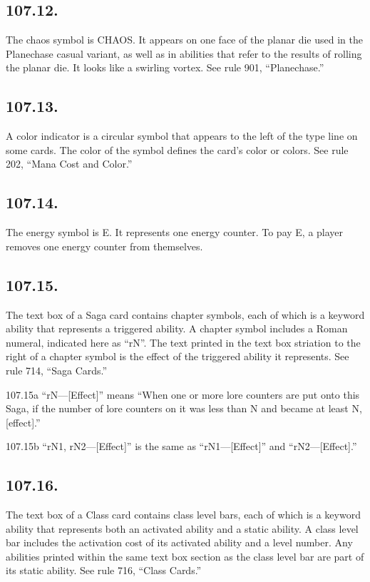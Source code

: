 \subsection*{107.12.}
The chaos symbol is {CHAOS}. It appears on one face of the planar die used in the Planechase casual variant, as well as in abilities that refer to the results of rolling the planar die. It looks like a swirling vortex. See rule 901, “Planechase.”

\subsection*{107.13.}
A color indicator is a circular symbol that appears to the left of the type line on some cards. The color of the symbol defines the card’s color or colors. See rule 202, “Mana Cost and Color.”

\subsection*{107.14.}
The energy symbol is {E}. It represents one energy counter. To pay {E}, a player removes one energy counter from themselves.

\subsection*{107.15.}
The text box of a Saga card contains chapter symbols, each of which is a keyword ability that represents a triggered ability. A chapter symbol includes a Roman numeral, indicated here as “rN”. The text printed in the text box striation to the right of a chapter symbol is the effect of the triggered ability it represents. See rule 714, “Saga Cards.”

107.15a “{rN}—[Effect]” means “When one or more lore counters are put onto this Saga, if the number of lore counters on it was less than N and became at least N, [effect].”

107.15b “{rN1}, {rN2}—[Effect]” is the same as “{rN1}—[Effect]” and “{rN2}—[Effect].”

\subsection*{107.16.}
The text box of a Class card contains class level bars, each of which is a keyword ability that represents both an activated ability and a static ability. A class level bar includes the activation cost of its activated ability and a level number. Any abilities printed within the same text box section as the class level bar are part of its static ability. See rule 716, “Class Cards.”

